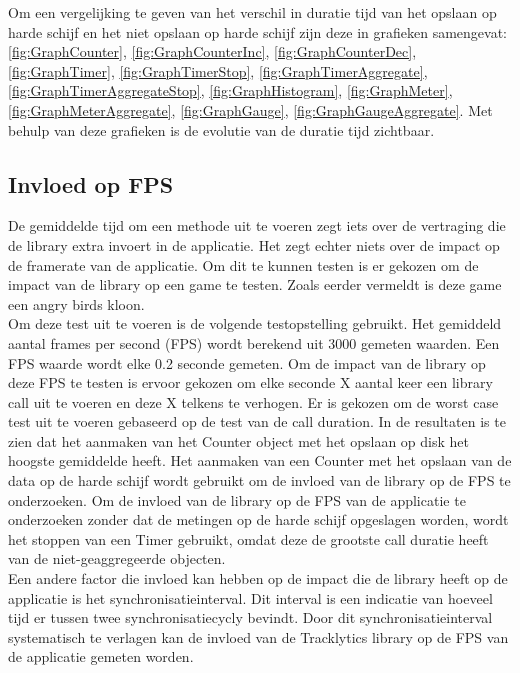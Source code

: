 Om een vergelijking te geven van het verschil in duratie tijd van het opslaan op harde schijf en het niet opslaan op harde schijf zijn deze in grafieken samengevat: \ref{fig:GraphCounter}, \ref{fig:GraphCounterInc}, \ref{fig:GraphCounterDec}, \ref{fig:GraphTimer}, \ref{fig:GraphTimerStop}, \ref{fig:GraphTimerAggregate}, \ref{fig:GraphTimerAggregateStop}, \ref{fig:GraphHistogram}, \ref{fig:GraphMeter}, \ref{fig:GraphMeterAggregate}, \ref{fig:GraphGauge}, \ref{fig:GraphGaugeAggregate}. Met behulp van deze grafieken is de evolutie van de duratie tijd zichtbaar. 

\subsection{Invloed op FPS}
De gemiddelde tijd om een methode uit te voeren zegt iets over de vertraging die de library extra invoert in de applicatie. Het zegt echter niets over de impact op de framerate van de applicatie. Om dit te kunnen testen is er gekozen om de impact van de library op een game te testen. Zoals eerder vermeldt is deze game een angry birds kloon. \\

Om deze test uit te voeren is de volgende testopstelling gebruikt. Het gemiddeld aantal frames per second (FPS) wordt berekend uit 3000 gemeten waarden. Een FPS waarde wordt elke 0.2 seconde gemeten. Om de impact van de library op deze FPS te testen is ervoor gekozen om elke seconde X aantal keer een library call uit te voeren en deze X telkens te verhogen. Er is gekozen om de worst case test uit te voeren gebaseerd op de test van de call duration. In de resultaten is te zien dat het aanmaken van het Counter object met het opslaan op disk het hoogste gemiddelde heeft. Het aanmaken van een Counter met het opslaan van de data op de harde schijf wordt gebruikt om de invloed van de library op de FPS te onderzoeken. Om de invloed van de library op de FPS van de applicatie te onderzoeken zonder dat de metingen op de harde schijf opgeslagen worden, wordt het stoppen van een Timer gebruikt, omdat deze de grootste call duratie heeft van de niet-geaggregeerde objecten. \\

Een andere factor die invloed kan hebben op de impact die de library heeft op de applicatie is het synchronisatieinterval. Dit interval is een indicatie van hoeveel tijd er tussen twee synchronisatiecycly bevindt. Door dit synchronisatieinterval systematisch te verlagen kan de invloed van de Tracklytics library op de FPS van de applicatie gemeten worden. \\

